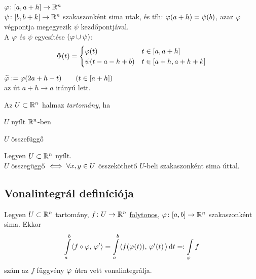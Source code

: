 \begin{de}
  $\varphi\colon [a,a+h]\to\mathbb{R}^n$\\$\psi\colon[b,b+k]\to\mathbb{R}^n$ szakaszonként sima utak, és tfh: $\varphi(a+h)=\psi(b)$, azaz
  $\varphi$ végpontja megegyezik $\psi$ kezdőpontjával. \\
  A $\varphi$ és $\psi$ egyesítése $(\varphi\cup\psi)$:
\[\Phi(t) = \begin{cases}\varphi(t) & t\in[a,a+h]\\\psi(t-a-h+b) & t\in[a+h,a+h+k]\end{cases}\]
\end{de}

\begin{de} $\widetilde{\varphi} := \varphi(2a+h-t)\qquad(t\in[a+h])$\\
  az út $a+h\to a$ irányú lett.
\end{de}

\begin{de}[Tartomány]Az $U\subset \mathbb{R}^n$ halmaz \emph{tartomány}, ha
  \begin{enumzjr}
  \item $U$ nyílt $\mathbb{R}^n$-ben
  \item $U$ összefüggő
  \end{enumzjr}
\end{de}
\begin{te}Legyen $U\subset \mathbb{R}^n$ nyílt.\\
  $U$ összegüggő $\iff \forall x,y\in  U$ összeköthető $U$-beli szakaszonként
  sima úttal.
\end{te}

\subsection{Vonalintegrál definíciója}
\begin{de}
  Legyen $U\subset \mathbb{R}^n$ tartomány, $f\colon U\to\mathbb{R}^n$ \underline{folytonos}, $\varphi\colon [a,b]\to\mathbb{R}^n$ szakaszonként
  sima. Ekkor
\[\Int_a^b\skalar{f\circ\vfi}{\vfi'} = \Int_a^b\skalar{f(\vfi(t))}{\vfi'(t)\,}\diff t =: \Int_\vfi f\]
szám az $f$ függvény $\varphi$ útra vett vonalintegrálja.
\end{de}

